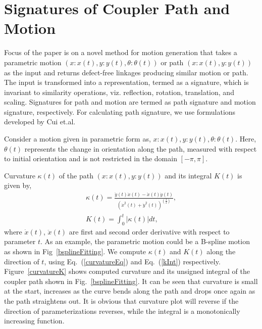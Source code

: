 \documentclass[twocolumn,10pt]{asme2ej}
\newcommand{\req}[1]{(\ref{#1})}
\begin{document}
\section{Signatures of Coupler Path and Motion}\label{sec_sign}
Focus of the paper is on a novel method for motion generation that takes a parametric motion $(x:x(t), y:y(t), \theta:\theta(t))$ or path $(x:x(t), y:y(t))$ as the input and returns defect-free linkages producing similar motion or path.
The input is transformed into a representation, termed as a signature, which is invariant to similarity operations, viz. reflection, rotation, translation, and scaling.
Signatures for path and motion are termed as path signature and motion signature, respectively.
For calculating path signature, we use formulations developed by Cui et.al\cite{cui2009}.

Consider a motion given in parametric form as, $x:x(t), y:y(t), \theta:\theta(t)$.
Here, $\theta(t)$ represents the change in orientation along the path, measured with respect to initial orientation and is not restricted in the domain $[-\pi, \pi]$.

Curvature $\kappa(t)$ of the path $(x:x(t), y:y(t))$ and its integral $K(t)$ is given by,
\begin{eqnarray}
  \kappa(t) = \frac{\ddot{y}(t)\dot{x}(t) - \ddot{x}(t)\dot{y}(t)}{{(\dot{x}^2(t) + \dot{y}^2(t))}^{(\frac 32)}}, \label{curvatureEq}\\
  K(t) = \int^{t}_0 |\kappa(t)|dt \label{kInt},
\end{eqnarray}
where $\dot{x}(t)$, $\ddot{x}(t)$ are first and second order derivative with respect to parameter $t$.
As an example, the parametric motion could be a B-spline motion as shown in Fig~\ref{bsplineFitting}.
We compute $\kappa(t)$ and $K(t)$ along the direction of $t$, using Eq.~\req{curvatureEq} and Eq.~\req{kInt} respectively.
Figure~\ref{curvatureK} shows computed curvature and its unsigned integral of the coupler path shown in Fig.~\ref{bsplineFitting}.
It can be seen that curvature is small at the start, increases as the curve bends along the path and drops once again as the path straightens out. It is obvious that curvature plot will reverse if the direction of parameterizations reverses, while the integral is a monotonically increasing function.
\end{document}
